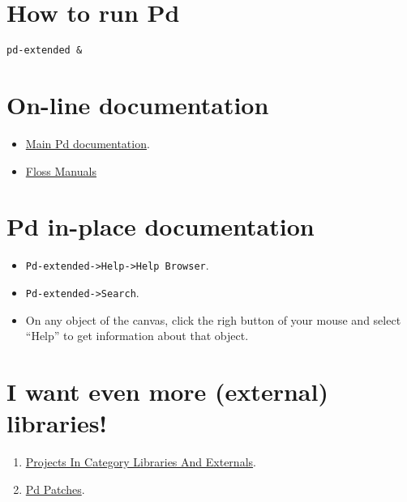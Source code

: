 
\section{How to run Pd}

\begin{verbatim}
pd-extended &
\end{verbatim}


\section{On-line documentation}

\begin{itemize}
\item \href{http://puredata.info/docs}{Main Pd documentation}.
\item \href{http://en.flossmanuals.net/PureData/}{Floss Manuals}
\end{itemize}


\section{Pd in-place documentation}

\begin{itemize}
\item \verb|Pd-extended->Help->Help Browser|.
\item \verb|Pd-extended->Search|.
\item On any object of the canvas, click the righ button of your
  mouse and select ``Help'' to get information about that object.
\end{itemize}


\section{I want even more (external) libraries!}

\begin{enumerate}
\item
  \href{http://puredata.info/downloads/by-category/library}{Projects
    In Category Libraries And Externals}.
\item
  \href{http://puredata.info/community/member-downloads/patches}{Pd
    Patches}.
\end{enumerate}



